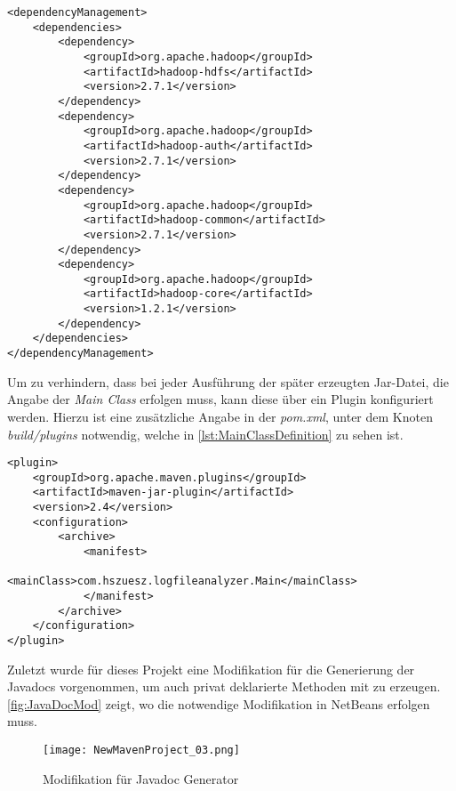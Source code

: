 \begin{lstlisting}[caption=Auszug aus der \textit{pom.xml},label=lst:PomXML]
<dependencyManagement>
	<dependencies>
		<dependency>
			<groupId>org.apache.hadoop</groupId>
			<artifactId>hadoop-hdfs</artifactId>
			<version>2.7.1</version>
		</dependency>
		<dependency>
			<groupId>org.apache.hadoop</groupId>
			<artifactId>hadoop-auth</artifactId>
			<version>2.7.1</version>
		</dependency>
		<dependency>
			<groupId>org.apache.hadoop</groupId>
			<artifactId>hadoop-common</artifactId>
			<version>2.7.1</version>
		</dependency>
		<dependency>
			<groupId>org.apache.hadoop</groupId>
			<artifactId>hadoop-core</artifactId>
			<version>1.2.1</version>
		</dependency>
	</dependencies>
</dependencyManagement>
\end{lstlisting}

Um zu verhindern, dass bei jeder Ausführung der später erzeugten Jar-Datei, die Angabe der \textit{Main Class} erfolgen muss, kann diese über ein \gls{Plugin} konfiguriert werden. Hierzu ist eine zusätzliche Angabe in der \textit{pom.xml}, unter dem Knoten \textit{build/plugins} notwendig, welche in \autoref{lst:MainClassDefinition} zu sehen ist. \\

\pagebreak
\begin{lstlisting}[caption=Definition der \textit{Main Class} des Projektes,label=lst:MainClassDefinition]
<plugin>
	<groupId>org.apache.maven.plugins</groupId>
	<artifactId>maven-jar-plugin</artifactId>
	<version>2.4</version>
	<configuration>
		<archive>
			<manifest>
				<mainClass>com.hszuesz.logfileanalyzer.Main</mainClass>
			</manifest>
		</archive>
	</configuration>
</plugin>
\end{lstlisting}

Zuletzt wurde für dieses Projekt eine Modifikation für die Generierung der Javadocs vorgenommen, um auch privat deklarierte Methoden mit zu erzeugen. \autoref{fig:JavaDocMod} zeigt, wo die notwendige Modifikation in \gls{NetBeans} erfolgen muss.

\begin{figure}[h]
	\texttt{[image: NewMavenProject\_03.png]}
	\caption{Modifikation für Javadoc Generator}
	\label{fig:JavaDocMod}
\end{figure}


